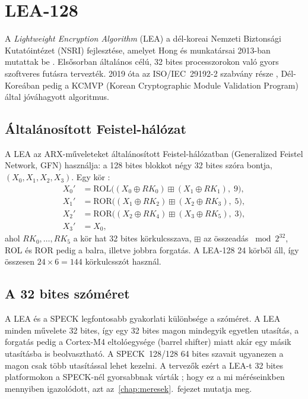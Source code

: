 \documentclass[a4paper,12pt]{report}
\theoremstyle{definition}
\theoremstyle{remark}
\begin{document}
\section{LEA-128}\label{sec:lea}

A \emph{Lightweight Encryption Algorithm} (LEA) a dél-koreai Nemzeti Biztonsági Kutatóintézet (NSRI) fejlesztése, amelyet Hong és munkatársai 2013-ban mutattak be \cite{Hong2013}. Elsősorban általános célú, 32 bites processzorokon való gyors szoftveres futásra tervezték. 2019 óta az ISO/IEC~29192-2 szabvány része \cite{ISO29192}, Dél-Koreában pedig a KCMVP (Korean Cryptographic Module Validation Program) által jóváhagyott algoritmus.

\subsection{Általánosított Feistel-hálózat}\label{sec:lea_kor}

A LEA az ARX-műveleteket általánosított Feistel-hálózatban (Generalized Feistel Network, GFN) használja: a 128 bites blokkot négy 32 bites szóra bontja, $(X_0, X_1, X_2, X_3)$. Egy kör \cite{Hong2013}:
\begin{align}
X_0' &= \text{ROL}\big((X_0 \oplus RK_0) \mathbin{\boxplus} (X_1 \oplus RK_1),\; 9\big), \\
X_1' &= \text{ROR}\big((X_1 \oplus RK_2) \mathbin{\boxplus} (X_2 \oplus RK_3),\; 5\big), \\
X_2' &= \text{ROR}\big((X_2 \oplus RK_4) \mathbin{\boxplus} (X_3 \oplus RK_5),\; 3\big), \\
X_3' &= X_0,
\end{align}
ahol $RK_0, \ldots, RK_5$ a kör hat 32 bites körkulcsszava, $\boxplus$ az összeadás $\bmod 2^{32}$, ROL és ROR pedig a balra, illetve jobbra forgatás. A LEA-128 24 körből áll, így összesen $24 \times 6 = 144$ körkulcsszót használ.

\subsection{A 32 bites szóméret}

A LEA és a SPECK legfontosabb gyakorlati különbsége a szóméret. A LEA minden művelete 32 bites, így egy 32 bites magon mindegyik egyetlen utasítás, a forgatás pedig a Cortex-M4 eltolóegysége (barrel shifter) miatt akár egy másik utasításba is beolvasztható. A SPECK~128/128 64 bites szavait ugyanezen a magon csak több utasítással lehet kezelni. A tervezők ezért a LEA-t 32 bites platformokon a SPECK-nél gyorsabbnak várták \cite{Hong2013}; hogy ez a mi méréseinkben mennyiben igazolódott, azt az~\ref{chap:meresek}.~fejezet mutatja meg.
\end{document}
